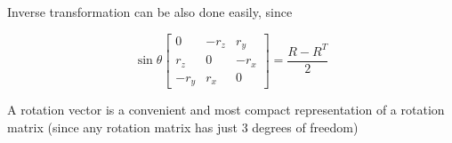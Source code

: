 \documentclass[12pt,a4paper]{article}
\begin{document}
Inverse transformation can be also done easily, since




\begin{equation}
 \sin{\theta}\left[\begin{array}{ccc}{0} & {-r_{z}} & {r_{y}} \\ {r_{z}} & {0} & {-r_{x}} \\ {-r_{y}} & {r_{x}} & {0}\end{array}\right]= \frac{R - R^T}{2}
\end{equation}

A rotation vector is a convenient and most compact representation of a rotation matrix (since any rotation matrix has just 3 degrees of freedom)
\end{document}
